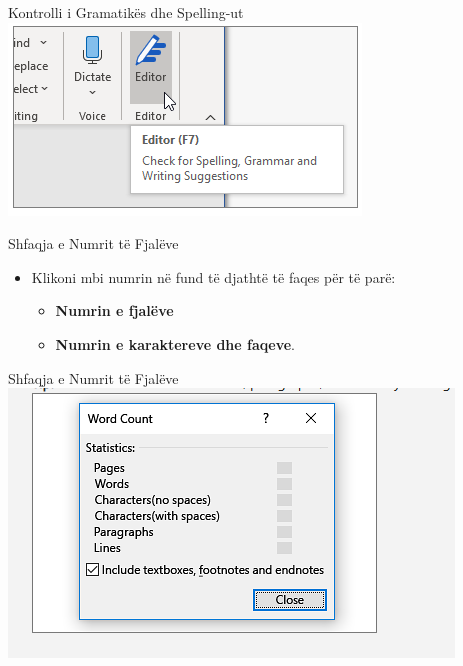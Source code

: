 \documentclass[
  ignorenonframetext,
]{beamer}
\begin{document}
\begin{frame}{Kontrolli i Gramatikës dhe Spelling-ut}
\label{kontrolli-i-gramatikuxebs-dhe-spelling-ut-1}
\includegraphics{./images/word21.png}
\end{frame}

\begin{frame}{Shfaqja e Numrit të Fjalëve}
\label{shfaqja-e-numrit-tuxeb-fjaluxebve}
\begin{itemize}
\item
  Klikoni mbi numrin në fund të djathtë të faqes për të parë:

  \begin{itemize}
  \item
    \textbf{Numrin e fjalëve}
  \item
    \textbf{Numrin e karaktereve dhe faqeve}.
  \end{itemize}
\end{itemize}
\end{frame}

\begin{frame}{Shfaqja e Numrit të Fjalëve}
\label{shfaqja-e-numrit-tuxeb-fjaluxebve-1}
\includegraphics{./images/word22.png}
\end{frame}
\end{document}
